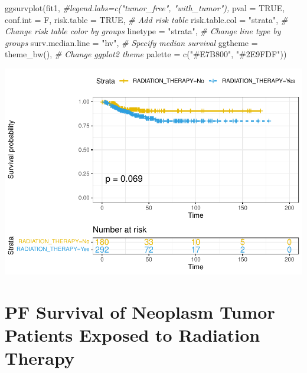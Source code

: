 \documentclass[
  11pt,
]{article}
\newenvironment{Shaded}{\begin{snugshade}}{\end{snugshade}}
\newcommand{\AttributeTok}[1]{\textcolor[rgb]{0.77,0.63,0.00}{#1}}
\newcommand{\CommentTok}[1]{\textcolor[rgb]{0.56,0.35,0.01}{\textit{#1}}}
\newcommand{\ConstantTok}[1]{\textcolor[rgb]{0.00,0.00,0.00}{#1}}
\newcommand{\FunctionTok}[1]{\textcolor[rgb]{0.00,0.00,0.00}{#1}}
\newcommand{\NormalTok}[1]{#1}
\newcommand{\StringTok}[1]{\textcolor[rgb]{0.31,0.60,0.02}{#1}}
\begin{document}
\newpage

\begin{Shaded}
\begin{Highlighting}[]
\FunctionTok{ggsurvplot}\NormalTok{(fit1,}
          \CommentTok{\#legend.labs=c("tumor\_free", "with\_tumor"),}
          \AttributeTok{pval =} \ConstantTok{TRUE}\NormalTok{, }\AttributeTok{conf.int =}\NormalTok{ F,}
          \AttributeTok{risk.table =} \ConstantTok{TRUE}\NormalTok{, }\CommentTok{\# Add risk table}
          \AttributeTok{risk.table.col =} \StringTok{"strata"}\NormalTok{, }\CommentTok{\# Change risk table color by groups}
          \AttributeTok{linetype =} \StringTok{"strata"}\NormalTok{, }\CommentTok{\# Change line type by groups}
          \AttributeTok{surv.median.line =} \StringTok{"hv"}\NormalTok{, }\CommentTok{\# Specify median survival}
          \AttributeTok{ggtheme =} \FunctionTok{theme\_bw}\NormalTok{(), }\CommentTok{\# Change ggplot2 theme}
          \AttributeTok{palette =} \FunctionTok{c}\NormalTok{(}\StringTok{"\#E7B800"}\NormalTok{, }\StringTok{"\#2E9FDF"}\NormalTok{))}
\end{Highlighting}
\end{Shaded}

\includegraphics{thyroid_1_files/figure-latex/unnamed-chunk-6-1.pdf}

\newpage
\section{PF Survival of Neoplasm Tumor Patients Exposed to Radiation Therapy}
\end{document}
